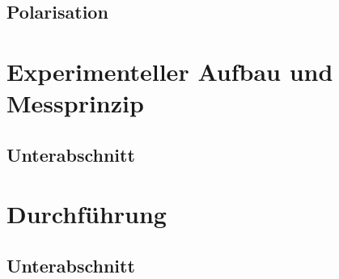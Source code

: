 \subsection{Polarisation}

\section{Experimenteller Aufbau und Messprinzip}
\subsection{Unterabschnitt}
\section{Durchführung}
\subsection{Unterabschnitt}